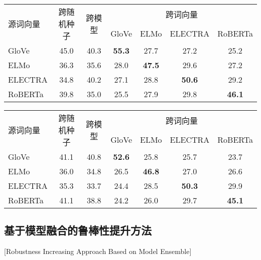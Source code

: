 \begin{table}[h]
    \vspace{0.5em}\centering\wuhao
	\begin{tabular}{lcccccc}
		\toprule[1.5pt]
		\multirow{2}{*}{源词向量}& \multirow{2}{*}{跨随机种子} & \multirow{2}{*}{跨模型} & \multicolumn{4}{c}{跨词向量} \\
		\cline{4-7}
		& &  & GloVe & ELMo & ELECTRA & RoBERTa \\
		\midrule[1pt]
		GloVe &45.0  &40.3  &\bf 55.3 &27.7 &27.2 &25.2 \\
		ELMo &36.3  &35.6  &28.0 &\bf 47.5 &29.6 &27.2 \\
		ELECTRA &34.8  &40.2  &27.1 &28.8 &\bf 50.6 &29.2 \\
		RoBERTa &39.8  &35.0  &25.5 &27.9 &29.8 &\bf 46.1 \\
		\bottomrule[1.5pt]
	\end{tabular}
\end{table}

\begin{table}[h]
    \vspace{0.5em}\centering\wuhao
	\begin{tabular}{lcccccc}
		\toprule[1.5pt]
		\multirow{2}{*}{源词向量}& \multirow{2}{*}{跨随机种子} & \multirow{2}{*}{跨模型} & \multicolumn{4}{c}{跨词向量} \\
		\cline{4-7}
		& &  & GloVe & ELMo & ELECTRA & RoBERTa \\
		\midrule[1pt]
		GloVe &41.1  &40.8  &\bf 52.6 &25.8 &25.7 &23.7 \\
		ELMo &36.0  &34.8  &26.5 &\bf 46.8 &27.0 &26.6 \\
		ELECTRA &35.3  &33.7  &24.4 &28.5 &\bf 50.3 &29.9 \\
		RoBERTa &41.1  &38.8  &24.2 &26.0 &29.7 &\bf 45.1 \\
		\bottomrule[1.5pt]
	\end{tabular}
\end{table}


\subsection{基于模型融合的鲁棒性提升方法}[Robustness Increasing Approach Based on Model Ensemble]


